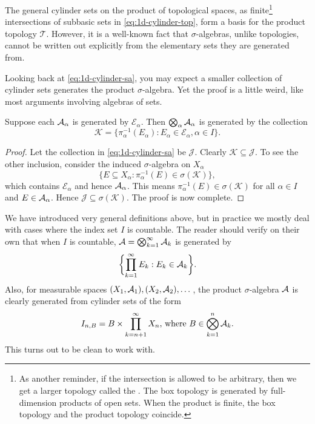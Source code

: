 The general cylinder sets on the product of topological spaces, as finite\footnote{As another reminder, if the intersection is allowed to be arbitrary, then we get a larger topology called the . The box topology is generated by full-dimension products of open sets. When the product is finite, the box topology and the product topology coincide.} intersections of subbasic sets in \eqref{eq:1d-cylinder-top}, form a basis for the product topology $\mathcal{T}$. However, it is a well-known fact that $\sigma$-algebras, unlike topologies, cannot be written out explicitly from the elementary sets they are generated from. %

Looking back at \eqref{eq:1d-cylinder-sa}, you may expect a smaller collection of cylinder sets generates the product $\sigma$-algebra. Yet the proof is a little weird, like most arguments involving algebras of sets.

\begin{prop} \label{prop:prod-s-algebra-generate}
    Suppose each $\mathcal{A}_\alpha$ is generated by $\mathcal{E}_\alpha$. Then $\bigotimes_{\alpha} \mathcal{A}_\alpha$ is generated by the collection \[
        \mathcal{K} = \{\pi_\alpha^{-1} (E_\alpha) : E_\alpha \in \mathcal{E}_\alpha, \alpha \in I\}.
    \]
\end{prop}
\begin{proof}
    Let the collection in \eqref{eq:1d-cylinder-sa} be $\mathcal{J}$. Clearly $\mathcal{K} \subseteq \mathcal{J}$. To see the other inclusion, consider the induced $\sigma$-algebra on $X_\alpha$ \[
        \{E \subseteq X_\alpha : \pi_\alpha^{-1}(E) \in \sigma(\mathcal{K})\},
    \] which contains $\mathcal{E}_\alpha$ and hence $\mathcal{A}_\alpha$. This means $\pi_\alpha^{-1}(E) \in \sigma(\mathcal{K})$ for all $\alpha \in I$ and $E \in \mathcal{A}_\alpha$. Hence $\mathcal{J} \subseteq \sigma(\mathcal{K})$. The proof is now complete.
\end{proof}

We have introduced very general definitions above, but in practice we mostly deal with cases where the index set $I$ is countable. The reader should verify on their own that when $I$ is countable, $\mathcal{A} = \bigotimes_{k=1}^\infty \mathcal{A}_k$ is generated by \[
    \biggl\{\prod_{k=1}^\infty E_k :E_k \in \mathcal{A}_k \biggr\}.
\] Also, for measurable spaces $(X_1,\mathcal{A}_1),(X_2,\mathcal{A}_2),\dotsc$, the product $\sigma$-algebra $\mathcal{A}$ is clearly generated from cylinder sets of the form \[
    I_{n,B} = B \times \prod_{k= n+ 1}^\infty X_n\text{, where }B \in \bigotimes_{k=1}^n \mathcal{A}_k.
\] This turns out to be clean to work with.



